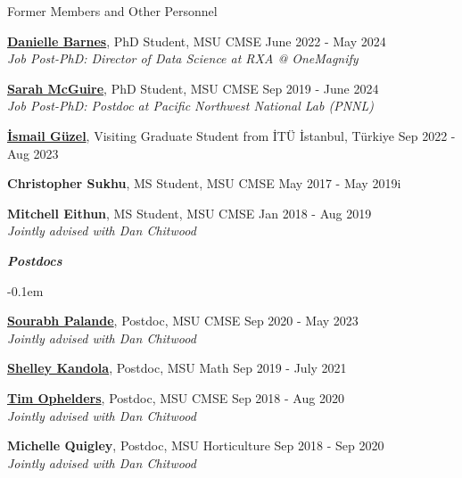 \documentclass{resume} %
\begin{document}
\begin{rSection}{Former Members and Other Personnel}
\begin{list}{}{\leftmargin=1em}
   \item \textbf{\href{https://www.linkedin.com/in/danielle-k-barnes/}{Danielle Barnes}}, PhD Student, MSU CMSE \hfill June 2022 - May 2024 \\ 
   \phantom{XXX} \textit{Job Post-PhD:  Director of Data Science at RXA @ OneMagnify}

   \item \textbf{\href{https://www.sarah-mcguire.com/}{Sarah McGuire}}, PhD Student, MSU CMSE \hfill Sep 2019 - June 2024\\
   \phantom{XXX} \textit{Job Post-PhD:  Postdoc at Pacific Northwest National Lab (PNNL)}
      

   \item \textbf{\href{https://ismailguzel.github.io/}{\.{I}smail G\"{u}zel}}, Visiting Graduate Student from  İTÜ İstanbul, Türkiye \hfill Sep 2022 - Aug 2023

   \item \textbf{Christopher Sukhu}, MS Student, MSU CMSE \hfill May 2017 - May 2019i

   \item \textbf{Mitchell Eithun}, MS Student, MSU CMSE \hfill Jan 2018 - Aug 2019
\\
   \phantom{XXX} \textit{Jointly advised with Dan Chitwood}
\end{list}

   \textbf{\textit{Postdocs}}
   \begin{list}{}{\leftmargin=1em}
      \itemsep -0.1em 
   \item \textbf{\href{http://sci.utah.edu/~sourabh/}{Sourabh Palande}}, Postdoc, MSU CMSE \hfill Sep 2020 - May 2023\\
   \phantom{XXX} \textit{Jointly advised with Dan Chitwood}

   \item \textbf{\href{www.shelleykandola.com}{Shelley Kandola}}, Postdoc, MSU Math \hfill Sep 2019 - July 2021

   \item \textbf{\href{https://research.tue.nl/en/persons/tim-ae-ophelders}{Tim Ophelders}}, Postdoc, MSU CMSE \hfill Sep 2018 - Aug 2020\\
   \phantom{XXX} \textit{Jointly advised with Dan Chitwood}
   \item \textbf{Michelle Quigley}, Postdoc, MSU Horticulture \hfill Sep 2018 - Sep 2020\\
   \phantom{XXX} \textit{Jointly advised with Dan Chitwood}
\end{list}


\end{rSection}
\end{document}
